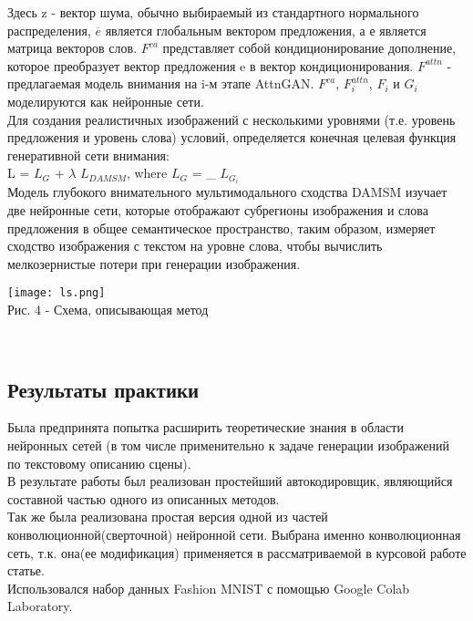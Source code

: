 \documentclass{article}
\begin{document}
Здесь z - вектор шума, обычно выбираемый из стандартного нормального распределения, $\overline{e}$ является глобальным вектором предложения, а е является матрица векторов слов. $F^{ca}$ представляет собой кондиционирование
дополнение, которое преобразует вектор предложения e в
вектор кондиционирования. $F^{attn}$ - предлагаемая модель внимания на i-м этапе AttnGAN. $F^{ca}$, $F^{attn}_{i} $, $F_{i}$ и $G_{i}$ моделируются как нейронные сети.\\
Для создания реалистичных изображений с несколькими уровнями (т.е.
уровень предложения и уровень слова) условий, определяется конечная целевая функция генеративной сети внимания:\\
L = $L_{G}$ + $\lambda$ $L_{DAMSM}$, where $L_{G}$ = \sum_{} 
 $L_{G_{i}}$\\
 
 Модель глубокого внимательного мультимодального сходства
DAMSM изучает две нейронные сети, которые отображают субрегионы изображения и слова предложения в общее семантическое пространство, таким образом, измеряет сходство изображения с текстом на уровне слова, чтобы вычислить мелкозернистые потери при генерации изображения.
\\
 \begin{center} 
  \texttt{[image: ls.png]}
  \\
  \caption*{Рис. 4 - Схема, описывающая метод} \\
 \end{center} 

\newpage
    \begin{center} 
    \section{Результаты практики}
    \end{center} 
      \large 
      
Была предпринята попытка расширить теоретические знания в области нейронных сетей (в том числе применительно к задаче генерации изображений по текстовому описанию сцены).\\

В результате работы был реализован простейший автокодировщик, являющийся составной частью одного из описанных методов.\\
Так же была реализована простая версия одной из частей конволюционной(сверточной) нейронной сети. Выбрана именно конволюционная сеть, т.к. она(ее модификация) применяется в рассматриваемой в курсовой работе статье. \\
Использовался набор данных Fashion MNIST с помощью Google Colab Laboratory. \\
      
\end{document}
